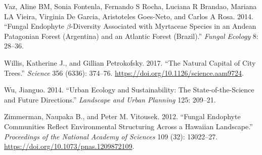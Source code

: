 \documentclass[fleqn,10pt,lineno]{wlpeerj} %
\newlength{\cslhangindent}
\newenvironment{CSLReferences}[2] %
 {%
  \setlength{\parindent}{0pt}
  \ifodd #1 \everypar{\setlength{\hangindent}{\cslhangindent}}\ignorespaces\fi
  \ifnum #2 > 0
  \setlength{\parskip}{#2\baselineskip}
  \fi
 }%
 {}
\begin{document}
\begin{CSLReferences}{1}{0}
\leavevmode{}%
Vaz, Aline BM, Sonia Fontenla, Fernando S Rocha, Luciana R Brandao, Mariana LA Vieira, Virginia De Garcia, Aristoteles Goes-Neto, and Carlos A Rosa. 2014. {``Fungal Endophyte \(\beta\)-Diversity Associated with Myrtaceae Species in an Andean Patagonian Forest (Argentina) and an Atlantic Forest (Brazil).''} \emph{Fungal Ecology} 8: 28--36.

\leavevmode{}%
Willis, Katherine J., and Gillian Petrokofsky. 2017. {``The Natural Capital of City Trees.''} \emph{Science} 356 (6336): 374--76. \url{https://doi.org/10.1126/science.aam9724}.

\leavevmode{}%
Wu, Jianguo. 2014. {``Urban Ecology and Sustainability: The State-of-the-Science and Future Directions.''} \emph{Landscape and Urban Planning} 125: 209--21.

\leavevmode{}%
Zimmerman, Naupaka B., and Peter M. Vitousek. 2012. {``Fungal Endophyte Communities Reflect Environmental Structuring Across a Hawaiian Landscape.''} \emph{Proceedings of the National Academy of Sciences} 109 (32): 13022--27. \url{https://doi.org/10.1073/pnas.1209872109}.

\end{CSLReferences}
\end{document}
